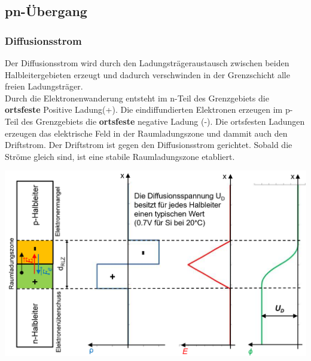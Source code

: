 \begin{multicols}{2}
    \begin{minipage}{\linewidth}
        \vspace{-2cm}
        \subsection{pn-Übergang}
        \subsubsection{Diffusionsstrom}
            Der Diffusionsstrom wird durch den Ladungsträgeraustausch zwischen beiden Halbleitergebieten erzeugt und dadurch verschwinden in der Grenzschicht alle freien Ladungsträger.\\
            Durch die Elektronenwanderung entsteht im n-Teil des Grenzgebiets die \textbf{ortsfeste} Positive Ladung(+). Die eindiffundierten Elektronen erzeugen im p-Teil des Grenzgebiets die \textbf{ortsfeste} negative Ladung (-). Die ortsfesten Ladungen erzeugen das elektrische Feld in der Raumladungszone und dammit auch den Driftstrom.\newline
            Der Driftstrom ist gegen den Diffusionsstrom gerichtet. Sobald die Ströme gleich sind, ist eine stabile Raumladungszone etabliert.   
    \end{minipage}
    
    \includegraphics[width=0.9\linewidth]{images/pnuebergang}
\end{multicols}

